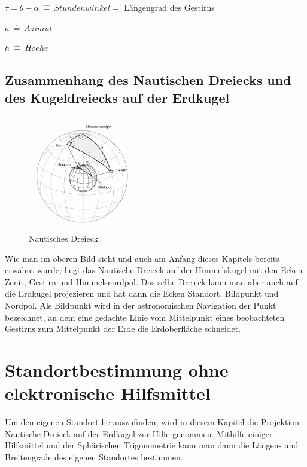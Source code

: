 $\tau = \theta-\alpha \ \widehat{=} \ Stundenwinkel =$ Längengrad des Gestirns 

$a \ \widehat{=} \ Azimut $

$h \ \widehat{=} \ Hoehe$



\newpage
\subsection{Zusammenhang des Nautischen Dreiecks und des Kugeldreiecks auf der Erdkugel}
\begin{figure}[h]
	\begin{center}
		\includegraphics[height=5cm,width=5cm]{papers/nav/bilder/kugel3.png}
		\caption[Nautisches Dreieck]{Nautisches Dreieck}
	\end{center}
\end{figure}

Wie man im oberen Bild sieht und auch am Anfang dieses Kapitels bereits erwähnt wurde, liegt das Nautische Dreieck auf der Himmelskugel mit den Ecken Zenit, Gestirn und Himmelsnordpol. 
Das selbe Dreieck kann man aber auch auf die Erdkugel projezieren und hat dann die Ecken Standort, Bildpunkt und Nordpol. 
Als Bildpunkt wird in der astronomischen Navigation der Punkt bezeichnet, an dem eine gedachte Linie vom Mittelpunkt eines beobachteten Gestirns zum Mittelpunkt der Erde die Erdoberfläche schneidet.


\section{Standortbestimmung ohne elektronische Hilfsmittel}
Um den eigenen Standort herauszufinden, wird in diesem Kapitel die Projektion Nautische Dreieck auf der Erdkugel zur Hilfe genommen. 
Mithilfe einiger Hilfsmittel und der Sphärischen Trigonometrie kann man dann die Längen- und Breitengrade des eigenen Standortes bestimmen.

